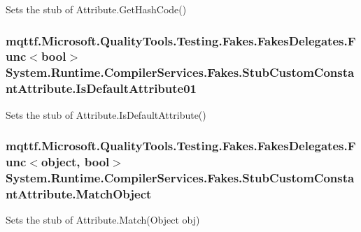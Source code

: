 Sets the stub of Attribute.\-Get\-Hash\-Code()

\hypertarget{class_system_1_1_runtime_1_1_compiler_services_1_1_fakes_1_1_stub_custom_constant_attribute_a34c01ab1967d46a5a814fe3296c781d0}{
\subsubsection[{Is\-Default\-Attribute01}]{\setlength{\rightskip}{0pt plus 5cm}mqttf.\-Microsoft.\-Quality\-Tools.\-Testing.\-Fakes.\-Fakes\-Delegates.\-Func$<$bool$>$ System.\-Runtime.\-Compiler\-Services.\-Fakes.\-Stub\-Custom\-Constant\-Attribute.\-Is\-Default\-Attribute01}}\label{class_system_1_1_runtime_1_1_compiler_services_1_1_fakes_1_1_stub_custom_constant_attribute_a34c01ab1967d46a5a814fe3296c781d0}


Sets the stub of Attribute.\-Is\-Default\-Attribute()

\hypertarget{class_system_1_1_runtime_1_1_compiler_services_1_1_fakes_1_1_stub_custom_constant_attribute_adf93cba4ade96866bb7a1d995c876664}{
\subsubsection[{Match\-Object}]{\setlength{\rightskip}{0pt plus 5cm}mqttf.\-Microsoft.\-Quality\-Tools.\-Testing.\-Fakes.\-Fakes\-Delegates.\-Func$<$object, bool$>$ System.\-Runtime.\-Compiler\-Services.\-Fakes.\-Stub\-Custom\-Constant\-Attribute.\-Match\-Object}}\label{class_system_1_1_runtime_1_1_compiler_services_1_1_fakes_1_1_stub_custom_constant_attribute_adf93cba4ade96866bb7a1d995c876664}


Sets the stub of Attribute.\-Match(\-Object obj)

